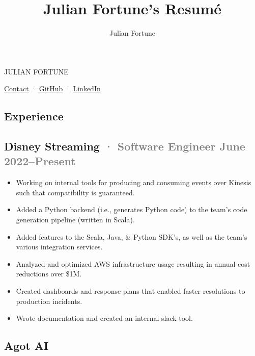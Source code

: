 \documentclass[12pt]{article} %
\title{Julian Fortune's Resumé}
\author{Julian Fortune}
\providecommand{\tightlist}{%
  \setlength{\itemsep}{0pt}\setlength{\parskip}{0pt}}
\let\defaultref\href
\renewcommand{\href}[2]{%
  \defaultref{#1}{\ul{#2}}%
}
\newcommand{\link}[2]{\href{#1}{#2}}
\renewcommand{\emph}[1]{%
  \textcolor{gray}{#1}%
}
\def\separator{ · {}}
\begin{document}
\begin{bfseries}\begin{huge}
  {\selectfont%
    \MakeTextUppercase{Julian Fortune}
  }
\end{huge}\end{bfseries}

  \link{https://julianfortune.com}{Contact}\separator%
    \link{http://github.com/julianfortune}{GitHub}\separator%
\link{http://linkedin.com/in/julianfortune}{LinkedIn}%

%
\begin{paracol}{2}
\begin{raggedright}

\hypertarget{experience}{%
\section{Experience}\label{experience}}

\hypertarget{disney-streaming-software-engineer-june-2022present}{%
\subsection{\texorpdfstring{Disney Streaming \emph{· \small Software
Engineer \hfill June
2022--Present}}{Disney Streaming · Software Engineer June 2022--Present}}\label{disney-streaming-software-engineer-june-2022present}}

\begin{itemize}
\tightlist
\item
  Working on internal tools for producing and consuming events over
  Kinesis such that compatibility is guaranteed.
\item
  Added a Python backend (i.e., generates Python code) to the team's
  code generation pipeline (written in Scala).
\item
  Added features to the Scala, Java, \& Python SDK's, as well as the
  team's various integration services.
\item
  Analyzed and optimized AWS infrastructure usage resulting in annual
  cost reductions over \$1M.
\item
  Created dashboards and response plans that enabled faster resolutions
  to production incidents.
\item
  Wrote documentation and created an internal slack tool.
\end{itemize}

\hypertarget{agot-ai}{%
\subsection{Agot AI}\label{agot-ai}}


\end{raggedright}
\end{paracol}
\end{document}
